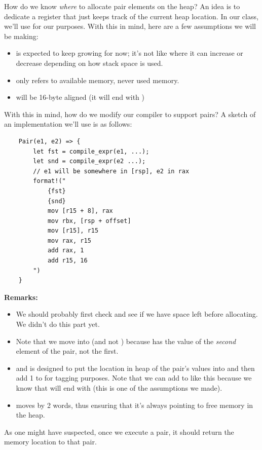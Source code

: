How do we know \emph{where} to allocate pair elements on the heap? An idea is to dedicate a register that just keeps track of the current heap location. In our class, we'll use  for our purposes. With this in mind, here are a few assumptions we will be making:
\begin{itemize}
    \item {} is expected to keep growing for now; it's not like  where it can increase or decrease depending on how stack space is used. 
    \item {} only refers to available memory, never used memory. 
    \item {} will be 16-byte aligned (it will end with )
\end{itemize}
With this in mind, how do we modify our compiler to support pairs? A sketch of an implementation we'll use is as follows: 
\begin{verbatim}
    Pair(e1, e2) => {
        let fst = compile_expr(e1, ...);
        let snd = compile_expr(e2 ...);
        // e1 will be somewhere in [rsp], e2 in rax 
        format!("
            {fst}
            {snd}
            mov [r15 + 8], rax 
            mov rbx, [rsp + offset]
            mov [r15], r15
            mov rax, r15 
            add rax, 1 
            add r15, 16
        ")
    }\end{verbatim}
\textbf{Remarks:} 
\begin{itemize}
    \item We should probably first check and see if we have space left before allocating. We didn't do this part yet.  
    \item Note that we move  into \code{[r15 + 8]} (and not \code{[r15]}) because  has the value of the \emph{second} element of the pair, not the first. 
    \item {} and  is designed to put the location in heap of the pair's values into  and then add 1 to  for tagging purposes. Note that we can add  to  like this because we know that  will end with  (this is one of the assumptions we made). 
    \item {} moves  by 2 words, thus ensuring that it's always pointing to free memory in the heap. 
\end{itemize}
As one might have suspected, once we execute a pair, it should return the memory location to that pair. 

